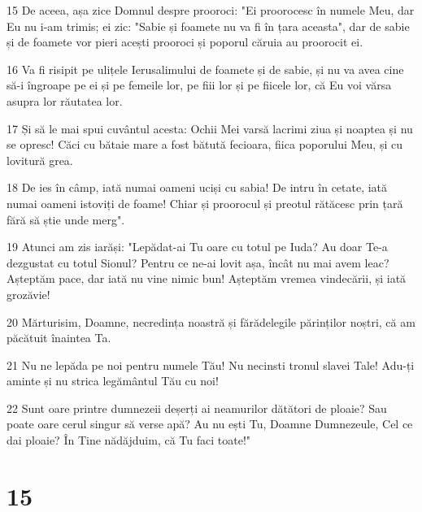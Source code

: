 \par 15 De aceea, așa zice Domnul despre prooroci: "Ei proorocesc în numele Meu, dar Eu nu i-am trimis; ei zic: "Sabie și foamete nu va fi în țara aceasta", dar de sabie și de foamete vor pieri acești prooroci și poporul căruia au proorocit ei.
\par 16 Va fi risipit pe ulițele Ierusalimului de foamete și de sabie, și nu va avea cine să-i îngroape pe ei și pe femeile lor, pe fiii lor și pe fiicele lor, că Eu voi vărsa asupra lor răutatea lor.
\par 17 Și să le mai spui cuvântul acesta: Ochii Mei varsă lacrimi ziua și noaptea și nu se opresc! Căci cu bătaie mare a fost bătută fecioara, fiica poporului Meu, și cu lovitură grea.
\par 18 De ies în câmp, iată numai oameni uciși cu sabia! De intru în cetate, iată numai oameni istoviți de foame! Chiar și proorocul și preotul rătăcesc prin țară fără să știe unde merg".
\par 19 Atunci am zis iarăși: "Lepădat-ai Tu oare cu totul pe Iuda? Au doar Te-a dezgustat cu totul Sionul? Pentru ce ne-ai lovit așa, încât nu mai avem leac? Așteptăm pace, dar iată nu vine nimic bun! Așteptăm vremea vindecării, și iată grozăvie!
\par 20 Mărturisim, Doamne, necredința noastră și fărădelegile părinților noștri, că am păcătuit înaintea Ta.
\par 21 Nu ne lepăda pe noi pentru numele Tău! Nu necinsti tronul slavei Tale! Adu-ți aminte și nu strica legământul Tău cu noi!
\par 22 Sunt oare printre dumnezeii deșerți ai neamurilor dătători de ploaie? Sau poate oare cerul singur să verse apă? Au nu ești Tu, Doamne Dumnezeule, Cel ce dai ploaie? În Tine nădăjduim, că Tu faci toate!"

\chapter{15}

